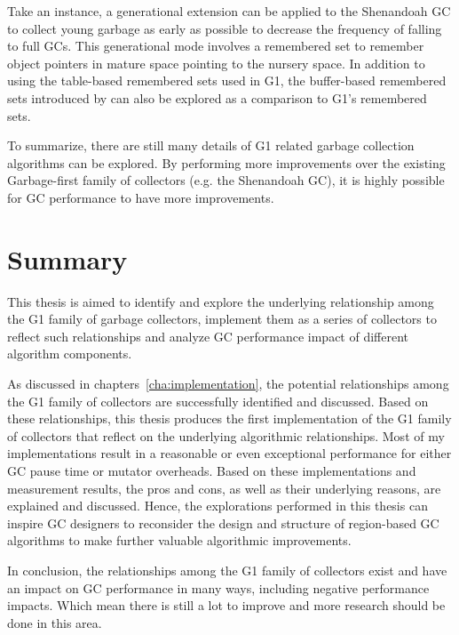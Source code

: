 Take an instance, a generational extension can be applied to the Shenandoah GC to collect
young garbage as early as possible to decrease the frequency of falling to full GCs.
This generational mode involves a remembered set to remember object pointers in mature
space pointing to the nursery space. In addition to using the table-based remembered
sets used in G1, the buffer-based remembered sets introduced by \cite{blackburn2008immix} can
also be explored as a comparison to G1's remembered sets.

To summarize, there are still many details of G1 related garbage collection algorithms can be
explored. By performing more improvements over the existing Garbage-first family of collectors
(e.g. the Shenandoah GC), it is highly possible for GC performance to have more improvements.

\section{Summary}

This thesis is aimed to identify and explore the underlying relationship among the
G1 family of garbage collectors, implement them as a series of collectors to
reflect such relationships and analyze GC performance impact of different algorithm components.

As discussed in chapters~\ref{cha:implementation}, the potential relationships among the G1 family of collectors
are successfully identified and discussed.
Based on these relationships, this thesis produces the first implementation of the
G1 family of collectors that reflect on the underlying algorithmic relationships.
Most of my implementations result in a reasonable
or even exceptional performance for either GC pause time or mutator overheads.
Based on these implementations and measurement results, the pros and cons, as well
as their underlying reasons, are explained and discussed.
Hence, the explorations performed in this thesis can inspire GC designers to
reconsider the design and structure of region-based GC algorithms to make
further valuable algorithmic improvements.

In conclusion, the relationships among the G1 family of collectors exist and have
an impact on GC performance in many ways, including negative performance impacts.
Which mean there is still a lot to improve and more research should be done in this area.





